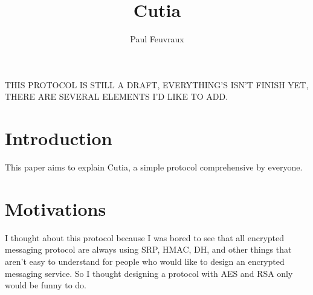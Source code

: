 \documentclass[a4paper,10pt]{article}
\title{Cutia}
\author{Paul Feuvraux}
\begin{document}
\maketitle

THIS PROTOCOL IS STILL A DRAFT, EVERYTHING'S ISN'T FINISH YET, THERE ARE SEVERAL ELEMENTS I'D LIKE TO ADD.

\section{Introduction}
This paper aims to explain Cutia, a simple protocol comprehensive by everyone.

\section{Motivations}
I thought about this protocol because I was bored to see that all encrypted messaging protocol are always using SRP, HMAC, DH, and other things that aren't easy to understand for people who would like to design an encrypted messaging service. So I thought designing a protocol with AES and RSA only would be funny to do.
\end{document}

